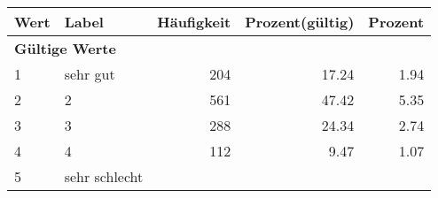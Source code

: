      \begin{longtable}{lXrrr}
     \toprule
     \textbf{Wert} & \textbf{Label} & \textbf{Häufigkeit} & \textbf{Prozent(gültig)} & \textbf{Prozent} \\
     \endhead
     \midrule
     \multicolumn{5}{l}{\textbf{Gültige Werte}}\\

     1 &
     \multicolumn{1}{X}{ sehr gut   } &


       \num{204} &
       \num[round-mode=places,round-precision=2]{17.24} &
         \num[round-mode=places,round-precision=2]{1.94} \\

     2 &
     \multicolumn{1}{X}{ 2   } &


       \num{561} &
       \num[round-mode=places,round-precision=2]{47.42} &
         \num[round-mode=places,round-precision=2]{5.35} \\

     3 &
     \multicolumn{1}{X}{ 3   } &


       \num{288} &
       \num[round-mode=places,round-precision=2]{24.34} &
         \num[round-mode=places,round-precision=2]{2.74} \\

     4 &
     \multicolumn{1}{X}{ 4   } &


       \num{112} &
       \num[round-mode=places,round-precision=2]{9.47} &
         \num[round-mode=places,round-precision=2]{1.07} \\

     5 &
     \multicolumn{1}{X}{ sehr schlecht   } &



\end{longtable}
